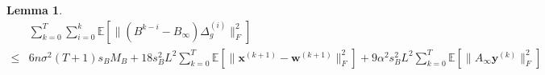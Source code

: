 \documentclass{article}
\newtheorem{lemma}[thm]{Lemma}
\newcommand{\vw}{{\mathbf{w}}}
\newcommand{\vx}{{\mathbf{x}}}
\newcommand{\vy}{{\mathbf{y}}}
\newcommand{\EE}[1]{\mathbb{E}\left[#1\right]}
\newcommand{\norm}[1]{\| #1 \|}
\begin{document}
\begin{lemma}\label{lemma: gradient consensus decomposition part 1}
{\begin{align*}
        &\sum_{k=0}^T\sum_{i=0}^k \EE{\norm{(B^{k-i}-B_{\infty})\Delta_g^{(i)}}_F^2}\\
        \leq& 6n\sigma^2(T+1)s_BM_B+18s_B^2L^2\sum_{k=0}^T\EE{\norm{\vx^{(k+1)}-\vw^{(k+1)}}_F^2}+9\alpha^2s_B^2L^2\sum_{k=0}^T\EE{\norm{A_{\infty}\vy^{(k)}}_F^2}
    \end{align*}}
\end{lemma}
\end{document}
